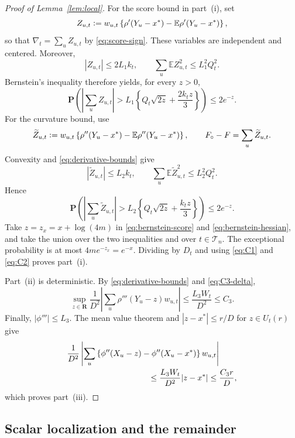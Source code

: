 \documentclass[11pt]{article}
\newcommand{\E}{\mathbb{E}}
\newcommand{\Pp}{\mathbf{P}}
\newcommand{\R}{\mathbf{R}}
\newcommand{\eqdef}{\mathrel{\vcentcolon=}}
\newcommand{\rhohu}{\rho}
\newcommand{\rhohum}{\phi}
\newcommand{\Signal}{X}
\newcommand{\Data}{Y}
\newcommand{\IF}{F}
\newcommand{\IFP}{F_{\circ}}
\newcommand{\DFN}{D}
\newcommand{\xs}{x^{*}}
\newcommand{\xx}{x}
\theoremstyle{definition}
\begin{document}
\begin{proof}[Proof of Lemma~\ref{lem:local}]
For the score bound in part~(i), set
\[
  Z_{u,t}\eqdef w_{u,t}
  \left\{\rhohu'(\Data_u-\xs)
  -\E\rhohu'(\Data_u-\xs)\right\},
\]
so that \(\nabla_t=\sum_uZ_{u,t}\) by \eqref{eq:score-sign}.
These variables are independent and centered.  Moreover,
\[
  |Z_{u,t}|\leq2L_1k_t,
  \qquad
  \sum_u\E Z_{u,t}^2\leq L_1^2Q_t^2.
\]
Bernstein's inequality therefore yields, for every \(z>0\),
\begin{equation}
  \Pp\left(
    \left|\sum_uZ_{u,t}\right|>
    L_1\left\{Q_t\sqrt{2z}+\frac{2k_tz}{3}\right\}
  \right)
  \leq2e^{-z}.
  \label{eq:bernstein-score}
\end{equation}
For the curvature bound, use
\[
  \widetilde Z_{u,t}\eqdef w_{u,t}
  \left\{\rhohu''(\Data_u-\xs)
  -\E\rhohu''(\Data_u-\xs)\right\},
  \qquad
  \IFP-\IF=\sum_u\widetilde Z_{u,t}.
\]
Convexity and \eqref{eq:derivative-bounds} give
\[
  |\widetilde Z_{u,t}|\leq L_2k_t,
  \qquad
  \sum_u\E\widetilde Z_{u,t}^2\leq L_2^2Q_t^2.
\]
Hence
\begin{equation}
  \Pp\left(
    \left|\sum_u\widetilde Z_{u,t}\right|>
    L_2\left\{Q_t\sqrt{2z}+\frac{k_tz}{3}\right\}
  \right)
  \leq2e^{-z}.
  \label{eq:bernstein-hessian}
\end{equation}
Take \(z=z_{\xx}=\xx+\log(4m)\) in
\eqref{eq:bernstein-score} and \eqref{eq:bernstein-hessian}, and take the
union over the two inequalities and over \(t\in\mathcal T_n\).  The exceptional
probability is at most
\(4m e^{-z_{\xx}}=e^{-\xx}\).  Dividing by \(\DFN_t\) and using
\eqref{eq:C1} and \eqref{eq:C2} proves part~(i).

Part~(ii) is deterministic.  By \eqref{eq:derivative-bounds} and
\eqref{eq:C3-delta},
\[
  \sup_{z\in\R}\frac{1}{\DFN^2}
  \left|\sum_u\rhohu'''(\Data_u-z)w_{u,t}\right|
  \leq\frac{L_3W_t}{\DFN^2}\leq C_3.
\]
Finally, \(|\rhohum'''|\leq L_3\).  The mean value theorem and
\(|z-\xs|\leq r/\DFN\) for \(z\in U_t(r)\) give
\begin{align*}
  &\frac{1}{\DFN^2}
  \left|\sum_u
    \left\{\rhohum''(\Signal_u-z)
    -\rhohum''(\Signal_u-\xs)\right\}w_{u,t}\right|\\
  &\hspace{35mm}\leq
    \frac{L_3W_t}{\DFN^2}|z-\xs|
    \leq\frac{C_3r}{\DFN},
\end{align*}
which proves part~(iii).
\end{proof}

\subsection{Scalar localization and the remainder}\label{sec:scalar-proof}
\end{document}
